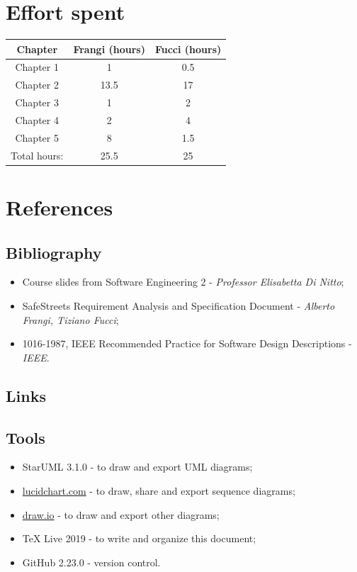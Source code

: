 \documentclass[12pt,a4paper]{report}
\begin{document}
	\chapter{Effort spent}
		\begin{table}[H]
			\centering
			\begin{tabular}[width = \textwidth]{|c|c|c|}
				\hline
				Chapter & Frangi (hours) & Fucci (hours)\\
				\hline
				\hline
				Chapter 1 & 1 & 0.5\\
				
				Chapter 2 & 13.5 & 17\\
				
				Chapter 3 & 1 & 2\\
				
				Chapter 4 & 2 & 4\\
				
				Chapter 5 & 8 & 1.5\\
				
				Total hours: & 25.5 & 25\\
				\hline
			\end{tabular}
			\label{tab: }
		\end{table}
	\chapter{References}
		\section{Bibliography}
		\begin{itemize}
			\item Course slides from Software Engineering 2 - \emph{Professor Elisabetta Di Nitto};
			\item SafeStreets Requirement Analysis and Specification Document - \emph{Alberto Frangi, Tiziano Fucci};
			\item 1016-1987, IEEE Recommended Practice for Software Design Descriptions - \emph{IEEE}.
		\end{itemize}
		\section{Links}
		\section{Tools}	
		\begin{itemize}		
		\item StarUML 3.1.0 - to draw and export UML diagrams;
		\item \url{lucidchart.com} - to draw, share and export sequence diagrams;
		\item \url{draw.io} - to draw and export other diagrams;
		\item TeX Live 2019 - to write and organize this document;
		\item GitHub 2.23.0 - version control.
		\end{itemize}
\end{document}
